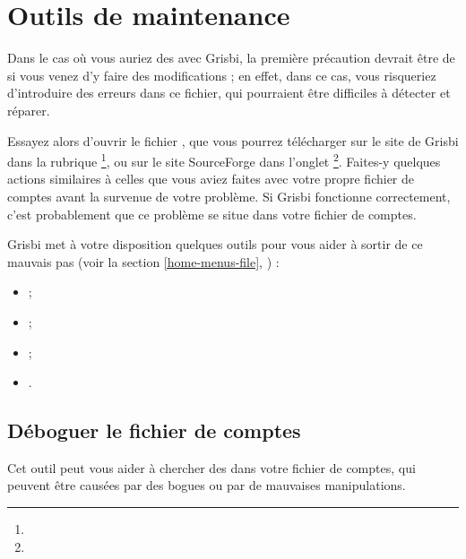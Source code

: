 
\chapter{Outils de maintenance\label{maintenance}}

Dans le cas où vous auriez des  avec Grisbi, la première précaution  devrait être de  si vous venez d'y faire des modifications ; en effet, dans ce cas, vous risqueriez d'introduire des erreurs dans ce fichier, qui pourraient être difficiles à détecter et réparer. 

Essayez alors d'ouvrir le fichier , que vous pourrez télécharger sur le site de Grisbi dans la rubrique \footnote{\urlGrisbi{}}, ou sur le site SourceForge dans l'onglet \footnote{\urlGitGrisbi}. Faites-y quelques actions similaires à celles que vous aviez faites avec votre propre fichier de comptes avant la survenue de votre problème. Si Grisbi fonctionne correctement, c'est probablement que ce problème se situe dans votre fichier de comptes.

Grisbi met à votre disposition quelques outils pour vous aider à sortir de ce mauvais pas (voir la section \vref{home-menus-file}, ) :
\begin{itemize}
	\item {} ; 
	\item {} ; 
	\item {} ;
	\item {}.
\end{itemize}


\section{Déboguer le fichier de comptes\label{maintenance-file-debug}}

Cet outil peut vous aider à chercher des  dans votre fichier de comptes, qui peuvent être causées par des bogues ou par de mauvaises manipulations.

